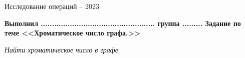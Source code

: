 \documentclass[a4paper,12pt]{article}
\begin{document}
             \begin{center} 
             Исследование операций --  2023 
            \end{center}
            \newline 
            \begin{center}
            \textbf{Выполнил ................................................... группа .........   Задание по теме <<Хроматическое число графа.>> }
            \end{center}
            \begin{flushleft} 
            \begin{center}     
            \textit{Найти хроматическое число в графе} 
            \end{center}
            \end{flushleft}
\end{document}
